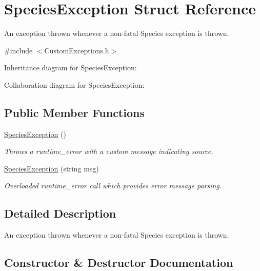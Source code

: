 \hypertarget{struct_species_exception}{}\section{Species\+Exception Struct Reference}
\label{struct_species_exception}


An exception thrown whenever a non-\/fatal Species exception is thrown.  




{\ttfamily \#include $<$Custom\+Exceptions.\+h$>$}



Inheritance diagram for Species\+Exception\+:


Collaboration diagram for Species\+Exception\+:
\subsection*{Public Member Functions}
\begin{DoxyCompactItemize}
\item 
\hyperlink{struct_species_exception_aad9febae65922d3a68a3d70ddc8b6a16}{Species\+Exception} ()\hypertarget{struct_species_exception_aad9febae65922d3a68a3d70ddc8b6a16}{}\label{struct_species_exception_aad9febae65922d3a68a3d70ddc8b6a16}

\begin{DoxyCompactList}\small\item\em Throws a runtime\+\_\+error with a custom message indicating source. \end{DoxyCompactList}\item 
\hyperlink{struct_species_exception_aee4c223dc1b702be3b937556f39b26a5}{Species\+Exception} (string msg)
\begin{DoxyCompactList}\small\item\em Overloaded runtime\+\_\+error call which provides error message parsing. \end{DoxyCompactList}\end{DoxyCompactItemize}


\subsection{Detailed Description}
An exception thrown whenever a non-\/fatal Species exception is thrown. 

\subsection{Constructor \& Destructor Documentation}
